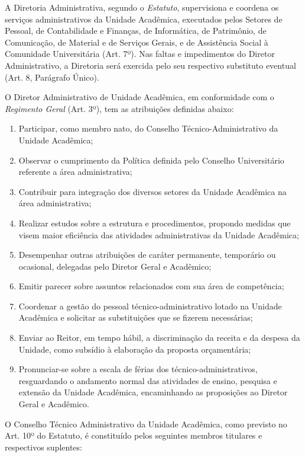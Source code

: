 \documentclass[
	12pt,				%
	openright,			%
  oneside,     %
	a4paper,			%
	chapter=TITLE,		%
	english,			%
	french,				%
	spanish,			%
	brazil				%
	]{abntex2}
\begin{document}
A Diretoria Administrativa, segundo o \textit{Estatuto}, supervisiona e coordena os serviços administrativos da Unidade Acadêmica, executados pelos Setores de Pessoal, de Contabilidade e Finanças, de Informática, de Patrimônio, de Comunicação, de Material e de Serviços Gerais, e de Assistência Social à Comunidade Universitária (Art. 7º). Nas faltas e impedimentos do Diretor Administrativo, a Diretoria será exercida pelo seu respectivo substituto eventual (Art. 8, Parágrafo Único).

O Diretor Administrativo de Unidade Acadêmica, em conformidade com o \textit{Regimento Geral} (Art. 3º), tem as atribuições definidas abaixo:

\begin{enumerate}
    \item Participar, como membro nato, do Conselho Técnico-Administrativo da Unidade Acadêmica;
    \item Observar o cumprimento da 	Política definida pelo Conselho Universitário referente a área administrativa;
    \item Contribuir para integração dos diversos setores da Unidade Acadêmica na área administrativa;
    \item Realizar estudos sobre a estrutura e procedimentos, propondo medidas que visem maior eficiência das atividades administrativas da Unidade Acadêmica;
    \item Desempenhar outras atribuições de caráter permanente, temporário ou ocasional, delegadas pelo Diretor Geral e Acadêmico;
    \item Emitir parecer sobre assuntos relacionados com sua área de competência;
    \item Coordenar a gestão do pessoal técnico-administrativo lotado na Unidade Acadêmica e solicitar as substituições que se fizerem necessárias;
    \item Enviar ao Reitor, em tempo 	hábil, a discriminação da receita e da despesa da Unidade, como subsídio à elaboração da proposta orçamentária; 
    \item Pronunciar-se sobre a escala de férias dos técnico-administrativos, resguardando o andamento 	normal das atividades de ensino, pesquisa e extensão da Unidade  Acadêmica, encaminhando as proposições ao Diretor Geral e Acadêmico.
\end{enumerate}

O Conselho Técnico Administrativo da Unidade Acadêmica, como previsto no Art. 10º do Estatuto, é constituído pelos seguintes membros titulares e respectivos suplentes:
\end{document}

